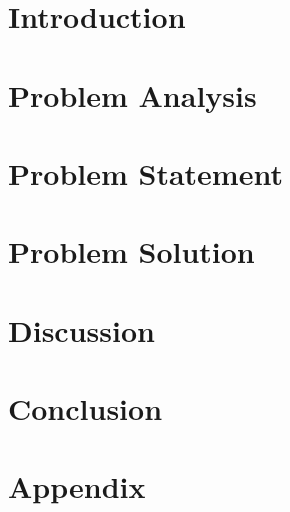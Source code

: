
\usepackage{booktabs} %


\cleardoublepage
\cleardoublepage

\cleardoublepage
\tableofcontents

\chapter{Introduction}
%

\chapter{Problem Analysis}


\chapter{Problem Statement}

\chapter{Problem Solution}


\chapter{Discussion}


\chapter{Conclusion}

\label{lastpage}

\appendix
\chapter{Appendix}

